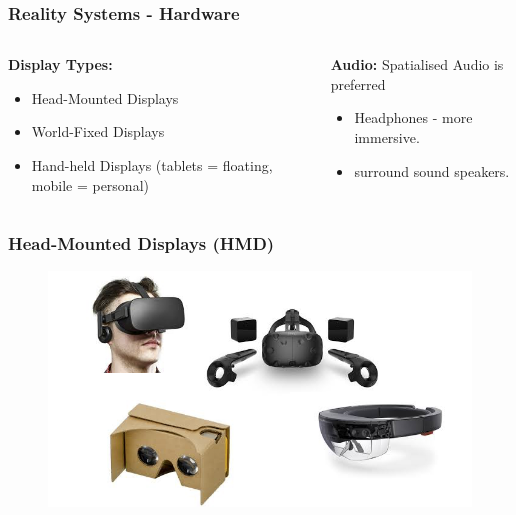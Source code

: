 \begin{frame}
	\frametitle{Reality Systems - Hardware}
	
	\begin{columns}
		
		\begin{column}{0.5\textwidth}
			\textbf{Display Types:}
			\begin{itemize}
				\item Head-Mounted Displays
				\item World-Fixed Displays
				\item Hand-held Displays (tablets = floating, mobile = personal)
			\end{itemize}
		\end{column}
		
		\begin{column}{0.5\textwidth}

			\textbf{Audio:}
			Spatialised Audio is preferred
			\begin{itemize}
				\item Headphones - more immersive.
				\item surround sound speakers.
			\end{itemize}
			
		\end{column}
		
	\end{columns}
\end{frame}

\begin{frame}
	\frametitle{Head-Mounted Displays (HMD)}
	\begin{figure}
		\includegraphics[scale=0.4]{assets/hmd.png}
	\end{figure}
\end{frame}

